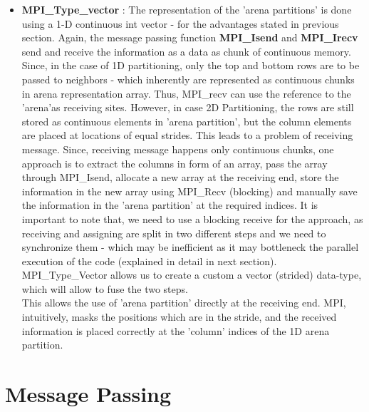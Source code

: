 \documentclass[a4paper, 10pt, conference]{IEEEtran}      %
\begin{document}
\begin{itemize}
		\item \textbf{MPI\_Type\_vector} : The representation of the 'arena partitions' is done using a 1-D continuous int vector - for the advantages stated in previous section. Again, the message passing function \textbf{MPI\_Isend} and \textbf{MPI\_Irecv} send and receive the information as a data as chunk of continuous memory. Since, in the case of 1D partitioning, only the top and bottom rows are to be passed to neighbors - which inherently are represented as continuous chunks in arena representation array. Thus,  MPI\_recv can use the reference to the 'arena'as receiving sites. However, in case 2D Partitioning, the rows are still stored as continuous elements in 'arena partition', but the column elements are placed at locations of equal strides. This leads to a problem of receiving message. Since, receiving message happens only continuous chunks, one approach is to extract the columns in form of an array, pass the array through MPI\_Isend, allocate a new array at the receiving end, store the information in the new array using MPI\_Recv (blocking) and manually save the information in the 'arena partition' at the required indices. It is important to note that, we need to use a blocking receive for the approach, as receiving and assigning are split in two different steps and we need to synchronize them - which may be inefficient as it may bottleneck the parallel execution of the code (explained in detail in next section). MPI\_Type\_Vector allows us to create a custom a vector (strided) data-type, which will allow to fuse the two steps.\\
		This allows the use of 'arena partition' directly at the receiving end. MPI, intuitively, masks the positions which are in the stride, and the received information is placed correctly at the 'column' indices of the 1D arena partition.
		
		
	\end{itemize}
	
	\section{Message Passing}
	
\end{document}
